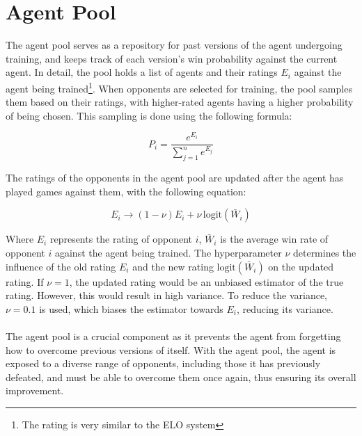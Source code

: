 \section{Agent Pool}
The agent pool serves as a repository for past versions of the agent undergoing training, and keeps track of each version's win probability against the current agent. In detail, the pool holds a list of agents and their ratings $E_i$ against the agent being trained\footnote{The rating is very similar to the ELO system}. When opponents are selected for training, the pool samples them based on their ratings, with higher-rated agents having a higher probability of being chosen. This sampling is done using the following formula:

\begin{equation}
    P_i = \frac{e^{E_i}}{\sum_{j=1}^n e^{E_j}}
    \label{eq:agent-pool-sampling}
\end{equation}

The ratings of the opponents in the agent pool are updated after the agent has played games against them, with the following equation:

\begin{equation}
    E_i \rightarrow (1-\nu) E_i + \nu \, \textrm{logit}(\bar W_i)
    \label{eq:agent-pool-rating-update}
\end{equation}

Where $E_i$ represents the rating of opponent $i$, $\bar W_i$ is the average win rate of opponent $i$ against the agent being trained. The hyperparameter $\nu$ determines the influence of the old rating $E_i$ and the new rating $\textrm{logit}(\bar W_i)$ on the updated rating. If $\nu = 1$, the updated rating would be an unbiased estimator of the true rating. However, this would result in high variance. To reduce the variance, $\nu = 0.1$ is used, which biases the estimator towards $E_i$, reducing its variance.\\\\
The agent pool is a crucial component as it prevents the agent from forgetting how to overcome previous versions of itself. With the agent pool, the agent is exposed to a diverse range of opponents, including those it has previously defeated, and must be able to overcome them once again, thus ensuring its overall improvement.

